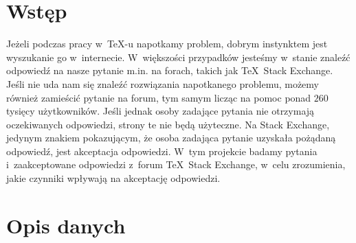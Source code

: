 \documentclass[12pt]{article}
\begin{document}
    \maketitle
    \tableofcontents
    \newpage

    \section{Wstęp}\label{sec:wstep}
  
Jeżeli podczas pracy w~\TeX-u napotkamy problem, dobrym instynktem jest wyszukanie go w~internecie. W~większości przypadków jesteśmy w~stanie znaleźć odpowiedź na nasze pytanie m.in. na forach, takich jak \TeX~Stack Exchange. Jeśli nie uda nam się znaleźć rozwiązania napotkanego problemu, możemy również zamieścić pytanie na forum, tym samym licząc na pomoc ponad $260$ tysięcy użytkowników. Jeśli jednak osoby zadające pytania nie otrzymają oczekiwanych odpowiedzi, strony te nie będą użyteczne. Na Stack Exchange, jedynym znakiem pokazującym, że osoba zadająca pytanie uzyskała pożądaną odpowiedź, jest akceptacja odpowiedzi. W~tym projekcie badamy pytania i~zaakceptowane odpowiedzi z~forum \TeX~Stack Exchange, w~celu zrozumienia, jakie czynniki wpływają na akceptację odpowiedzi.

	\section{Opis danych}\label{sec:opis-danych}
\end{document}
